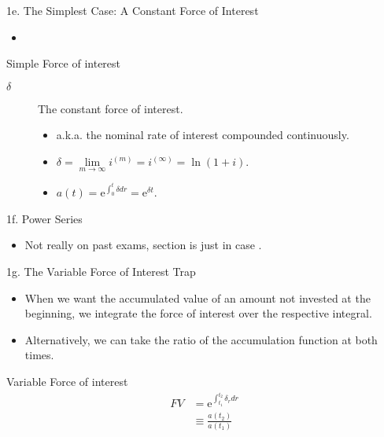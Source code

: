 \begin{CHPT_SUMM_AUTO}[label = {L.-1e}]{1e. The Simplest Case: A Constant Force of Interest}
	\begin{itemize}[leftmargin = *]
		\item	
	\end{itemize}
	
\begin{FORMULA_SUMM}{Simple Force of interest}
\begin{description}
	\item[$\delta$]	The constant force of interest.
		\begin{itemize}[leftmargin = *]
		\item	a.k.a. the nominal rate of interest compounded continuously.
		\item	$\delta = \underset{m \rightarrow \infty}{\lim} i^{(m)} = i^{(\infty)} = \ln(1 + i)$.
		\item	$a(t)	=	\textrm{e}^{\int_{0}^{t}\delta dr}	=	\textrm{e}^{\delta t}$.
		\end{itemize}
\end{description}
\end{FORMULA_SUMM}
\end{CHPT_SUMM_AUTO}

\begin{CHPT_SUMM_AUTO}[label = {L.-1f}]{1f. Power Series}
	\begin{itemize}[leftmargin = *]
		\item	Not really on past exams, section is \og just in case \fg{}.
	\end{itemize}
\end{CHPT_SUMM_AUTO}

\begin{CHPT_SUMM_AUTO}[label = {L.-1g}]{1g. The Variable Force of Interest Trap}
	\begin{itemize}[leftmargin = *]
		\item	When we want the accumulated value of an amount not invested at the beginning, we integrate the force of interest over the respective integral. 
		\item	Alternatively, we can take the ratio of the accumulation function at both times.
	\end{itemize}

\begin{FORMULA_SUMM}{Variable Force of interest}
\begin{align*}
	FV
	&=	\textrm{e}^{\int_{t_{1}}^{t_{2}}\delta_{r} dr}	\\
	&\equiv	\frac{a(t_{2})}{a(t_{1})}	
\end{align*}
\end{FORMULA_SUMM}
\end{CHPT_SUMM_AUTO}

